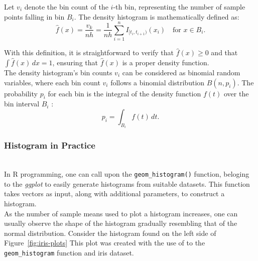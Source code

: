 \documentclass{article}\usepackage[]{graphicx}\usepackage[]{xcolor}
\numberwithin{equation}{section}
\begin{document}
\noindent Let $v_i$ denote the bin count of the $i$-th bin, representing the number of sample points falling in bin $B_i$. The density histogram is mathematically defined as:
\[ \hat{f}(x) = \frac{v_k}{nh} = \frac{1}{nh} \sum_{i=1}^{n} I_{[t_i,t_{i+1})}(x_i) \quad \text{for } x \in B_i.\]

\noindent With this definition, it is straightforward to verify that $ \hat{f}(x) \geq 0 $ and that $ \int \hat{f}(x) \, dx = 1 $, ensuring that $ \hat{f}(x) $ is a proper density function.\\

\noindent
The density histogram's bin counts ${v_{i}}$ can be considered as binomial random variables, where each bin count $v_{i}$ follows a binomial distribution $B(n,p_{i})$. The probability $p_{i}$ for each bin is the integral of the density function $f(t)$ over the bin interval $B_{i}$ \cite{scott2015multivariate}:
$$p_{i} = \int_{B_i} f(t) \, dt. $$

\subsubsection{Histogram in Practice}\\

\noindent In R programming, one can call upon the \texttt{geom\_histogram()} function, beloging to the \textit{ggplot} to easily generate histograms from suitable datasets. This function takes vectors as input, along with additional parameters, to construct a histogram.\\

\noindent As the number of sample means used to plot a histogram increases, one can usually observe the shape of the histogram gradually resembling that of the normal distribution. Consider the histogram found on the left side of Figure~\ref{fig:iris-plots} This plot was created with the use of to the \texttt{geom\_histogram} function and iris dataset.\\
\end{document}
